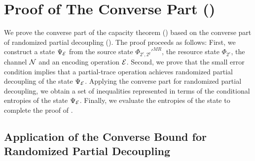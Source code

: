 \documentclass[journal]{IEEEtran}
\begin{document}
\section{Proof of The Converse Part ()}

We prove the converse part of the capacity theorem () based on the converse part of randomized partial decoupling ().
The proof proceeds as follows: 
First, we construct a state $\Psi_{{\mathcal E}}$ from the source state $\Phi_{2^c,2^q}'^{MR}$, the resource state $\Phi_{2^e}$, the channel ${\mathcal N}$ and an encoding operation ${\mathcal E}$.
Second, we prove that the small error condition  implies that a partial-trace operation achieves randomized partial decoupling of the state $\Psi_{{\mathcal E}}$.
Applying the converse part for randomized partial decoupling, we obtain a set of inequalities represented in terms of the conditional entropies of the state $\Psi_{{\mathcal E}}$.
Finally, we evaluate the entropies of the state to complete the proof of .




\subsection{Application of the Converse Bound for Randomized Partial Decoupling}
\end{document}
